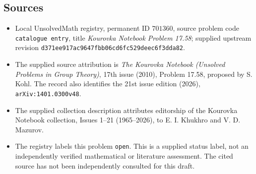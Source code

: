 \documentclass[11pt]{article}
\begin{document}
\subsection{Sources}
\begin{itemize}
\item Local UnsolvedMath registry, permanent ID \(701360\), source problem code \texttt{catalogue entry}, title \emph{Kourovka Notebook Problem 17.58}; supplied upstream revision \texttt{d371ee917ac9647fbb06cd6fc529deec6f3dda82}.
\item The supplied source attribution is \emph{The Kourovka Notebook (Unsolved Problems in Group Theory)}, 17th issue (2010), Problem 17.58, proposed by S. Kohl. The record also identifies the 21st issue edition (2026), \texttt{arXiv:1401.0300v48}.
\item The supplied collection description attributes editorship of the Kourovka Notebook collection, Issues 1--21 (1965--2026), to E. I. Khukhro and V. D. Mazurov.
\item The registry labels this problem \texttt{open}. This is a supplied status label, not an independently verified mathematical or literature assessment. The cited source has not been independently consulted for this draft.
\end{itemize}
\end{document}
